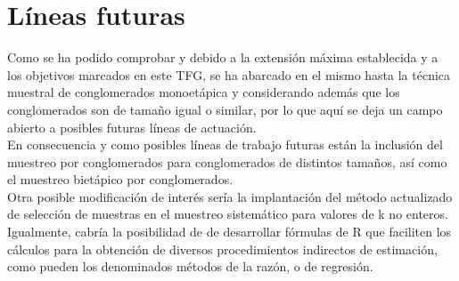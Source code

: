 
\section{Líneas futuras}
Como se ha podido comprobar y debido a la extensión máxima establecida y a los objetivos marcados en este TFG, se ha abarcado en el mismo hasta la técnica muestral de conglomerados monoetápica y considerando además que los conglomerados son de tamaño igual o similar, por lo que aquí se deja un campo abierto a posibles futuras líneas de actuación.\\

En consecuencia y como posibles líneas de trabajo futuras están la inclusión del muestreo por conglomerados para conglomerados de distintos tamaños, así como el muestreo bietápico por conglomerados.\\

Otra posible modificación de interés sería la implantación del método actualizado de selección de muestras en el muestreo sistemático para valores de k no enteros. \cite{RD}\\

Igualmente, cabría la posibilidad de de desarrollar fórmulas de R que faciliten los cálculos para la obtención de diversos procedimientos indirectos de estimación, como pueden los denominados métodos de la razón, o de regresión.
